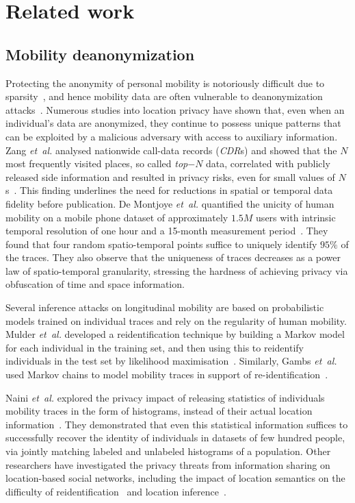 \section{Related work}


\subsection{Mobility deanonymization}

Protecting the anonymity of personal mobility is notoriously difficult due to sparsity~\citep{aggarwal2008}, and hence mobility data are often vulnerable to deanonymization attacks~\citep{Narayanan2008}.
Numerous studies into location privacy have shown that, even when an individual's data are anonymized, they continue to possess unique patterns that can be exploited by a malicious adversary with access to auxiliary information.
Zang \emph{et~al.} analysed nationwide call-data records (\emph{CDR}s) and showed that the $N$ most frequently visited places, so called \emph{top$-N$} data, correlated with publicly released side information and resulted in privacy risks, even for small values of $N$s~\citep{Zang2011}.
This finding underlines the need for reductions in spatial or temporal data fidelity before publication.
De Montjoye \emph{et~al.} quantified the unicity of human mobility on a mobile phone dataset of approximately $1.5M$ users with intrinsic temporal resolution of one hour and a 15-month measurement period~\citep{DeMontjoye2013}.
They found that four random spatio-temporal points suffice to uniquely identify $ 95\% $ of the traces.
They also observe that the uniqueness of traces decreases as a power law of spatio-temporal granularity, stressing the hardness of achieving privacy via obfuscation of time and space information.

Several inference attacks on longitudinal mobility are based on probabilistic models trained on individual traces and rely on the regularity of human mobility.
Mulder \emph{et~al.} developed a reidentification technique by building a Markov model for each individual in the training set, and then using this to reidentify individuals in the test set by likelihood maximisation~\cite{deMulder08}.
Similarly, Gambs \emph{et~al.} used Markov chains to model mobility traces in support of re-identification~\cite{Gambs2014}.

Naini \emph{et~al.} explored the privacy impact of releasing statistics of individuals mobility traces in the form of histograms, instead of their actual location information~\cite{Naini2016a}. They demonstrated that even this statistical information suffices to successfully recover the identity of individuals in datasets of few hundred people, via jointly matching labeled and unlabeled histograms of a population.
Other researchers have investigated the privacy threats from information sharing on location-based social networks, including the impact of location semantics on the difficulty of reidentification~\cite{privacyAndTheCity} and location inference~\cite{Agir}.

